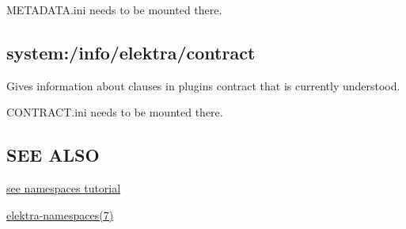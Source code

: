 {\ttfamily M\+E\+T\+A\+D\+A\+T\+A.\+ini} needs to be mounted there.\hypertarget{doc_help_elektra-hierarchy_md_autotoc_md1675}{}\subsection{system\+:/info/elektra/contract}\label{doc_help_elektra-hierarchy_md_autotoc_md1675}
Gives information about clauses in plugin\textquotesingle{}s contract that is currently understood.

{\ttfamily C\+O\+N\+T\+R\+A\+C\+T.\+ini} needs to be mounted there.\hypertarget{doc_help_elektra-hierarchy_md_autotoc_md1676}{}\subsection{S\+E\+E A\+L\+SO}\label{doc_help_elektra-hierarchy_md_autotoc_md1676}

\begin{DoxyItemize}
\item \hyperlink{doc_tutorials_namespaces_md}{see namespaces tutorial}
\item \hyperlink{doc_help_elektra-namespaces_md}{elektra-\/namespaces(7)} 
\end{DoxyItemize}